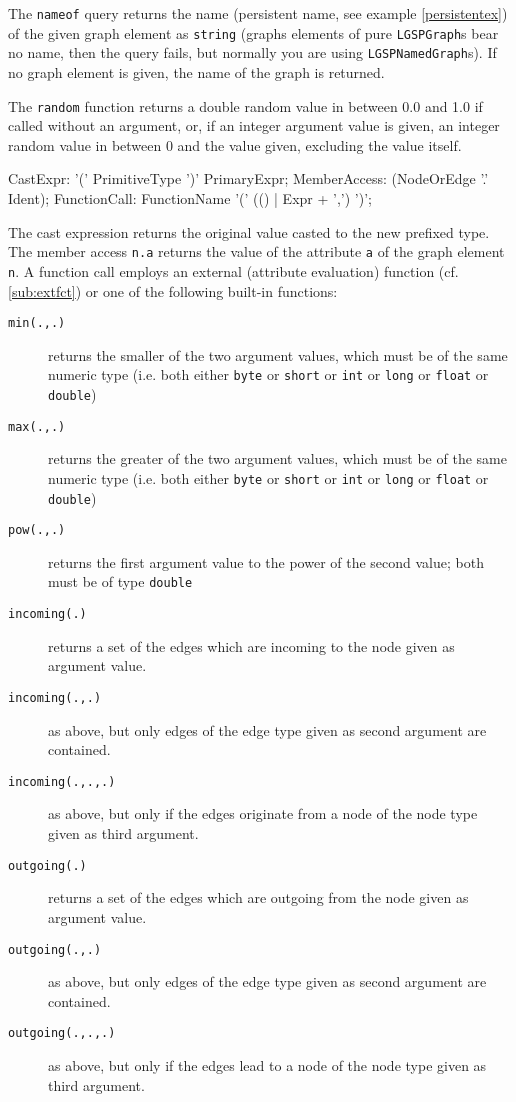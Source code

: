 The \texttt{nameof} query returns the name (persistent name, see example \ref{persistentex}) of the given graph element as \texttt{string}
(graphs elements of pure \texttt{LGSPGraph}s bear no name, then the query fails, but normally you are using \texttt{LGSPNamedGraph}s).
If no graph element is given, the name of the graph is returned.

The \texttt{random} function returns a double random value in between 0.0 and 1.0 if called without an argument,
or, if an integer argument value is given, an integer random value in between 0 and the value given, excluding the value itself.

\begin{rail}
  CastExpr: '(' PrimitiveType ')' PrimaryExpr;
  MemberAccess: (NodeOrEdge '.' Ident);
  FunctionCall: FunctionName '(' (() | Expr + ',') ')';
\end{rail}

The cast expression returns the original value casted to the new prefixed type.
The member access \texttt{n.a} returns the value of the attribute \texttt{a} of the graph element \texttt{n}.
A function call employs an external (attribute evaluation) function (cf. \ref{sub:extfct}) or one of the following built-in functions:

\begin{description}
\item[\texttt{min(.,.)}] returns the smaller of the two argument values, which must be of the same numeric type (i.e. both either \texttt{byte} or \texttt{short} or \texttt{int} or \texttt{long} or \texttt{float} or \texttt{double})
\item[\texttt{max(.,.)}] returns the greater of the two argument values, which must be of the same numeric type (i.e. both either \texttt{byte} or \texttt{short} or \texttt{int} or \texttt{long} or \texttt{float} or \texttt{double})
\item[\texttt{pow(.,.)}] returns the first argument value to the power of the second value; both must be of type \texttt{double}
\item[\texttt{incoming(.)}] returns a set of the edges which are incoming to the node given as argument value.
\item[\texttt{incoming(.,.)}] as above, but only edges of the edge type given as second argument are contained.
\item[\texttt{incoming(.,.,.)}] as above, but only if the edges originate from a node of the node type given as third argument.
\item[\texttt{outgoing(.)}] returns a set of the edges which are outgoing from the node given as argument value.
\item[\texttt{outgoing(.,.)}] as above, but only edges of the edge type given as second argument are contained.
\item[\texttt{outgoing(.,.,.)}] as above, but only if the edges lead to a node of the node type given as third argument.
\end{description}

